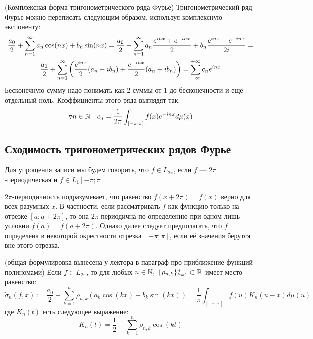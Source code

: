 \begin{note} (Комплексная форма тригонометрического ряда Фурье)
	Тригонометрический ряд Фурье можно переписать следующим образом, используя комплексную экспоненту:
	\begin{multline*}
		\frac{a_0}{2} + \sum_{n = 1}^\infty a_n\cos(nx) + b_n\sin(nx) = \frac{a_0}{2} + \sum_{n = 1}^\infty a_n\frac{e^{inx} + e^{-inx}}{2} + b_n\frac{e^{inx} - e^{-inx}}{2i} =
		\\
		\frac{a_0}{2} + \sum_{n = 1}^\infty \left(\frac{e^{inx}}{2}(a_n - ib_n) + \frac{e^{-inx}}{2}(a_n + ib_n)\right) = \sum_{-\infty}^{+\infty} c_ne^{inx}
	\end{multline*}
	Бесконечную сумму надо понимать как 2 суммы от 1 до бесконечности и ещё отдельный ноль. Коэффициенты этого ряда выглядят так:
	\[
		\forall n \in \mathbb{N} \quad c_n = \frac{1}{2\pi} \int_{[-\pi; \pi]} f(x)e^{-inx}d\mu(x)
	\]
\end{note}

\subsection{Сходимость тригонометрических рядов Фурье}

\begin{note}
	Для упрощения записи мы будем говорить, что $f \in L_{2\pi}$, если $f$ --- $2\pi$-периодическая и $f \in L_1[-\pi; \pi]$
\end{note}

\begin{anote}
	$2\pi$-периодичность подразумевает, что равенство $f(x + 2\pi) = f(x)$ верно для всех разумных $x$. В частности, если рассматривать $f$ как функцию только на отрезке $[a; a + 2\pi]$, то она $2\pi$-периодична по определению при одном лишь условии $f(a) = f(a + 2\pi)$. Однако далее следует предполагать, что $f$ определена в некоторой окрестности отрезка $[-\pi; \pi]$, если её значения берутся вне этого отрезка.
\end{anote}

\begin{lemma} (общая формулировка вынесена у лектора в параграф про приближение функций полиномами) \label{fourier_partial_sum}
	Если $f \in L_{2\pi}$, то для любых $n \in \N, \ \{\rho_{n,k}\}_{k=1}^n \subset \R$ имеет место равенство:
	\[
		\widetilde{\sigma}_n(f, x) := \frac{a_0}{2} + \sum_{k = 1}^n \rho_{n,k} (a_k\cos(kx) + b_k\sin(kx)) = \frac{1}{\pi}\int_{[-\pi; \pi]} f(u)K_n(u - x)d\mu(u)
	\]
	где $K_n(t)$ есть следующее выражение:
	\[
		K_n(t) = \frac{1}{2} + \sum_{k = 1}^n \rho_{n,k} \cos(kt)
	\]
\end{lemma}


